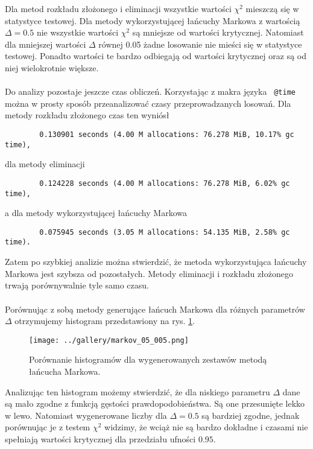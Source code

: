 \documentclass[a4paper,12pt]{article}
\begin{document}
    \noaka Dla metod rozkładu złożonego i eliminacji wszystkie wartości $\chi^2$ mieszczą się w statystyce testowej.
    Dla metody wykorzystującej łańcuchy Markowa z wartością $\Delta = 0.5$ nie wszystkie wartości $\chi^2$ są mniejsze od wartości krytycznej.
    Natomiast dla mniejszej wartości $\Delta$ równej 0.05 żadne losowanie nie mieści się w statystyce testowej. 
    Ponadto wartości te bardzo odbiegają od wartości krytycznej oraz są od niej wielokrotnie większe.     
    \\
    \\
    Do analizy pozostaje jeszcze czas obliczeń. 
    Korzystając z makra języka \julia $\,$ \texttt{@time} można w prosty sposób przeanalizować czasy przeprowadzanych losowań.
    Dla metody rozkładu złożonego czas ten wyniósł
    \begin{verbatim}
        0.130901 seconds (4.00 M allocations: 76.278 MiB, 10.17% gc time),
    \end{verbatim}
    dla metody eliminacji
    \begin{verbatim}
        0.124228 seconds (4.00 M allocations: 76.278 MiB, 6.02% gc time),
    \end{verbatim}
    a dla metody wykorzystującej łańcuchy Markowa
    \begin{verbatim}
        0.075945 seconds (3.05 M allocations: 54.135 MiB, 2.58% gc time).
    \end{verbatim}
    Zatem po szybkiej analizie można stwierdzić, że metoda wykorzystująca łańcuchy Markowa jest szybsza od pozostałych.
    Metody eliminacji i rozkładu złożonego trwają porównywalnie tyle samo czasu.
    \\
    \\
    Porównując z sobą metody generujące łańcuch Markowa dla różnych parametrów $\Delta$ otrzymujemy histogram przedstawiony na rys. \ref{markow2}.
    \begin{figure}[H]
        \centering
        \texttt{[image: ../gallery/markov\_05\_005.png]}
        \caption{Porównanie histogramów dla wygenerowanych zestawów metodą łańcucha Markowa.}
        \label{markow2}
    \end{figure}
    
    \noaka Analizując ten histogram możemy stwierdzić, że dla niskiego parametru $\Delta$ dane są mało zgodne z funkcją gęstości prawdopodobieństwa.
    Są one przesunięte lekko w lewo.
    Natomiast wygenerowane liczby dla $\Delta = 0.5$ są bardziej zgodne, jednak porównując je z testem $\chi^2$ widzimy, że wciąż nie są bardzo dokładne i czasami nie spełniają wartości krytycznej dla przedziału ufności $0.95$.
\end{document}
